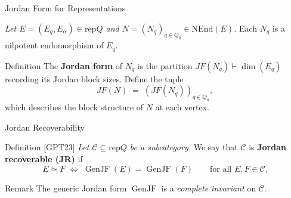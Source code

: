 \documentclass[t]{beamer}
\theoremstyle{plain}
\newcommand{\GenJF}{\operatorname{GenJF}}
\begin{document}
\begin{frame}{Jordan Form for Representations}
  
    \emph{Let $E=(E_q,E_\alpha)\in \mathrm{rep}Q$ and 
    $N=(N_q)_{q\in Q_0}\in \mathrm{NEnd}(E)$.}
    Each $N_q$ is a nilpotent endomorphism of $E_q$.
  

  \begin{block}{Definition}
    The \textbf{Jordan form} of $N_q$ is the partition
    $JF(N_q)\vdash \dim(E_q)$ recording its Jordan block sizes.
    Define the tuple
    \[
      JF(N) \;=\; (JF(N_q))_{q\in Q_0},
    \]
    which describes the block structure of $N$ at each vertex.
  \end{block}
\end{frame}



\begin{frame}{Jordan Recoverability}
  \begin{block}{Definition [GPT23]}
    \emph{Let $\mathscr{C}\subseteq \mathrm{rep}Q$ be a subcategory.}
    We say that $\mathscr{C}$ is \textbf{Jordan recoverable (JR)} if
    \[
      E \simeq F 
      \;\Longleftrightarrow\;
      \GenJF(E)=\GenJF(F)
      \qquad\text{for all } E,F\in \mathscr{C}.
    \]
  \end{block}

  \begin{block}{Remark}
    The generic Jordan form $\GenJF$ is a \emph{complete invariant} on $\mathscr{C}$.
  \end{block}
\end{frame}
\end{document}
